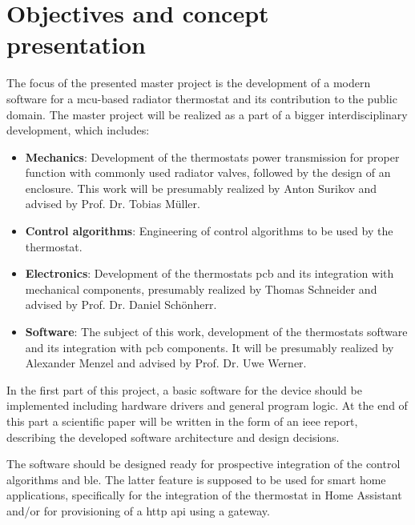 %
%

\chapter{Objectives and concept presentation}
\label{chap:Objectives and concept presentation}
%
The focus of the presented master project is the development of a modern software for a \ac{mcu}-based radiator thermostat and its contribution to the public domain. The master project will be realized as a part of a bigger interdisciplinary development, which includes:

\begin{itemize}
	\item \textbf{Mechanics}: Development of the thermostats power transmission for proper function with commonly used radiator valves, followed by the design of an enclosure. This work will be presumably realized by Anton Surikov and advised by Prof. Dr. Tobias Müller.
	\item \textbf{Control algorithms}: Engineering of control algorithms to be used by the thermostat.
	\item \textbf{Electronics}: Development of the thermostats \acs{pcb} and its integration with mechanical components, presumably realized by Thomas Schneider and advised by Prof. Dr. Daniel Schönherr.
	\item \textbf{Software}: The subject of this work, development of the thermostats software and its integration with \acs{pcb} components. It will be presumably realized by Alexander Menzel and advised by Prof. Dr. Uwe Werner.
\end{itemize}

In the first part of this project, a basic software for the device should be implemented including hardware drivers and general program logic. At the end of this part a scientific paper will be written in the form of an \ac{ieee} report, describing the developed software architecture and design decisions.

The software should be designed ready for prospective integration of the control algorithms and \ac{ble}. The latter feature is supposed to be used for smart home applications, specifically for the integration of the thermostat in Home Assistant and/or for provisioning of a \ac{http} \ac{api} using a gateway.

